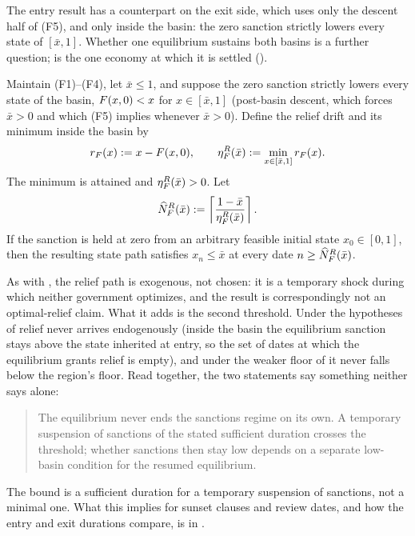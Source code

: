 The entry result has a counterpart on the exit side, which uses only the
descent half of \textup{(F5)}, and only inside the basin: the zero sanction
strictly lowers every state of $[\bar x,1]$.
Whether one equilibrium sustains both basins is a further question;
 is the one economy at which it is settled
().

\begin{theorem}
\label{thm:relief-exit}
Maintain \textup{(F1)--(F4)}, let $\bar x\le1$, and suppose the zero
sanction strictly lowers every state of the basin, $F(x,0)<x$ for
$x\in[\bar x,1]$ (post-basin descent, which forces $\bar x>0$ and which
\textup{(F5)} implies whenever $\bar x>0$). Define the relief
drift and its minimum inside the basin by
\[
  r_{F}(x):=x-F(x,0),
  \qquad
  \eta^{R}_{F}(\bar x):=\min_{x\in[\bar x,1]}r_{F}(x).
\]
The minimum is attained and $\eta^{R}_{F}(\bar x)>0$. Let
\[
  \widehat N^{R}_{F}(\bar x)
  :=\left\lceil\frac{1-\bar x}{\eta^{R}_{F}(\bar x)}\right\rceil .
\]
If the sanction is held at zero from an arbitrary feasible initial state
$x_0\in[0,1]$, then the resulting state path satisfies $x_n\le\bar x$ at every
date $n\ge\widehat N^{R}_{F}(\bar x)$.
\end{theorem}

As with , the relief path is exogenous, not chosen: it is a
temporary shock during which neither government optimizes, and the result is
correspondingly not an optimal-relief claim. What it adds is the second
threshold. Under the hypotheses of  relief never arrives
endogenously (inside the basin the equilibrium sanction stays above the state
inherited at entry, so the set of dates at which the equilibrium grants relief
is empty), and under the weaker floor of  it never
falls below the region's floor. Read together, the two statements say something
neither says alone:

\begin{quote}
The equilibrium never ends the sanctions regime on its own. A temporary
suspension of sanctions of the stated sufficient duration crosses the threshold;
whether sanctions then stay low depends on a separate low-basin
condition for the resumed equilibrium.
\end{quote}

The bound is a sufficient duration for a temporary suspension
of sanctions, not a minimal one. What this implies for sunset clauses and review
dates, and how the entry and exit durations compare, is in
.

